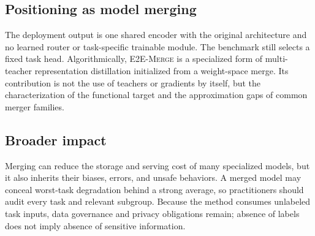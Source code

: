 \documentclass[letterpaper]{article} %
\newcommand{\method}{\textup{\textsc{E2E-Merge}}\xspace}
\theoremstyle{plain}
\theoremstyle{definition}
\begin{document}
\subsection{Positioning as model merging}
The deployment output is one shared encoder with the original architecture and no learned router or task-specific trainable module.
The benchmark still selects a fixed task head.
Algorithmically, \method is a specialized form of multi-teacher representation distillation initialized from a weight-space merge.
Its contribution is not the use of teachers or gradients by itself, but the characterization of the functional target and the approximation gaps of common merger families.

\subsection{Broader impact}
Merging can reduce the storage and serving cost of many specialized models, but it also inherits their biases, errors, and unsafe behaviors.
A merged model may conceal worst-task degradation behind a strong average, so practitioners should audit every task and relevant subgroup.
Because the method consumes unlabeled task inputs, data governance and privacy obligations remain; absence of labels does not imply absence of sensitive information.


\end{document}
